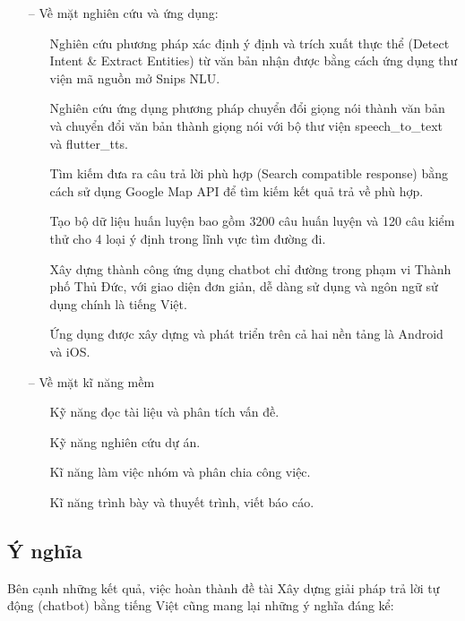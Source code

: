 \begin{itemize}
    \item[--] Về mặt nghiên cứu và ứng dụng:
        \begin{itemize}
            \item[\textbullet] Nghiên cứu phương pháp xác định ý định và trích xuất thực thể (Detect Intent \& Extract Entities) từ văn bản nhận được bằng cách ứng dụng thư viện mã nguồn mở Snips NLU. 
            \item[\textbullet] Nghiên cứu ứng dụng phương pháp chuyển đổi giọng nói thành văn bản và chuyển đổi văn bản thành giọng nói với bộ thư viện speech\_to\_text và flutter\_tts.  
            \item[\textbullet] Tìm kiếm đưa ra câu trả lời phù hợp (Search compatible response) bằng cách sử dụng Google Map API để tìm kiếm kết quả trả về phù hợp. 
            \item[\textbullet] Tạo bộ dữ liệu huấn luyện bao gồm 3200 câu huấn luyện và 120 câu kiểm thử cho 4 loại ý định trong lĩnh vực tìm đường đi. 
            \item[\textbullet] Xây dựng thành công ứng dụng chatbot chỉ đường trong phạm vi Thành phố Thủ Đức, với giao diện đơn giản, dễ dàng sử dụng và ngôn ngữ sử dụng chính là tiếng Việt. 
            \item[\textbullet] Ứng dụng được xây dựng và phát triển trên cả hai nền tảng là Android và iOS.
        \end{itemize}
    \item[--] Về mặt kĩ năng mềm
        \begin{itemize}
            \item[\textbullet] Kỹ năng đọc tài liệu và phân tích vấn đề.
            \item[\textbullet] Kỹ năng nghiên cứu dự án.
            \item[\textbullet] Kĩ năng làm việc nhóm và phân chia công việc.
            \item[\textbullet] Kĩ năng trình bày và thuyết trình, viết báo cáo.
        \end{itemize}
\end{itemize}

\subsection{Ý nghĩa}
Bên cạnh những kết quả, việc hoàn thành đề tài Xây dựng giải pháp trả lời tự động (chatbot) bằng tiếng Việt cũng mang lại những ý nghĩa đáng kể:

